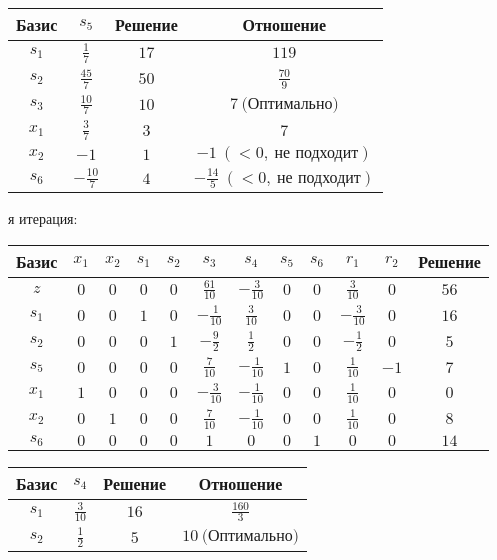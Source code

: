 \documentclass{article}%
\begin{document}
\begin{flushleft}
\begin{tabular}{|cccc|}
\hline%
Базис&$s_{5}$&Решение&Отношение\\%
\hline%
$s_{1}$&$\frac{1}{7}$&$17$&$119$\\%
$s_{2}$&$\frac{45}{7}$&$50$&$\frac{70}{9}$\\%
$s_{3}$&$\frac{10}{7}$&$10$&$7\: \text{(Оптимально)}$\\%
$x_{1}$&$\frac{3}{7}$&$3$&$7$\\%
$x_{2}$&$-1$&$1$&$-1\: (< 0, \: \text{не подходит})$\\%
$s_{6}$&$-\frac{10}{7}$&$4$&$-\frac{14}{5}\: (< 0, \: \text{не подходит})$\\%
\hline%
\end{tabular}%
\newline%
\newline%
я итерация: %
\newline%
\newline%
\renewcommand{\arraystretch}{1.3}%
\begin{tabular}{|c|cccccccccc|c|}%
\hline%
Базис&$x_{1}$&$x_{2}$&$s_{1}$&$s_{2}$&$s_{3}$&$s_{4}$&$s_{5}$&$s_{6}$&$r_{1}$&$r_{2}$&Решение\\%
\hline%
$z$&$0$&$0$&$0$&$0$&$\frac{61}{10}$&$-\frac{3}{10}$&$0$&$0$&$\frac{3}{10}$&$0$&$56$\\%
\hline%
$s_{1}$&$0$&$0$&$1$&$0$&$-\frac{1}{10}$&$\frac{3}{10}$&$0$&$0$&$-\frac{3}{10}$&$0$&$16$\\%
$s_{2}$&$0$&$0$&$0$&$1$&$-\frac{9}{2}$&$\frac{1}{2}$&$0$&$0$&$-\frac{1}{2}$&$0$&$5$\\%
$s_{5}$&$0$&$0$&$0$&$0$&$\frac{7}{10}$&$-\frac{1}{10}$&$1$&$0$&$\frac{1}{10}$&$-1$&$7$\\%
$x_{1}$&$1$&$0$&$0$&$0$&$-\frac{3}{10}$&$-\frac{1}{10}$&$0$&$0$&$\frac{1}{10}$&$0$&$0$\\%
$x_{2}$&$0$&$1$&$0$&$0$&$\frac{7}{10}$&$-\frac{1}{10}$&$0$&$0$&$\frac{1}{10}$&$0$&$8$\\%
$s_{6}$&$0$&$0$&$0$&$0$&$1$&$0$&$0$&$1$&$0$&$0$&$14$\\%
\hline%
\end{tabular}%
\newline%
\newline%
\newline%
\begin{tabular}{|cccc|}%
\hline%
Базис&$s_{4}$&Решение&Отношение\\%
\hline%
$s_{1}$&$\frac{3}{10}$&$16$&$\frac{160}{3}$\\%
$s_{2}$&$\frac{1}{2}$&$5$&$10\: \text{(Оптимально)}$\\%

\end{tabular}
\end{flushleft}
\end{document}

